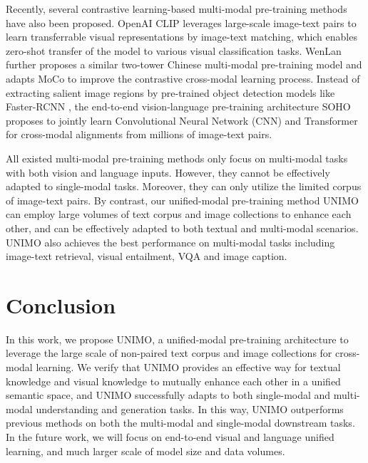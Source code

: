 \documentclass[11pt,a4paper]{article}
\begin{document}
Recently, several contrastive learning-based multi-modal pre-training methods have also been proposed. 
OpenAI CLIP \citep{radford2021learning} leverages large-scale image-text pairs to learn transferrable visual representations by image-text matching, which enables zero-shot transfer of the model to various visual classification tasks. 
WenLan \citep{huo2021wenlan} further proposes a similar two-tower Chinese multi-modal pre-training model and adapts MoCo \citep{he2020momentum} to improve the contrastive cross-modal learning process.
Instead of extracting salient image regions by pre-trained object detection models like Faster-RCNN \citep{ren2016faster}, the end-to-end vision-language pre-training architecture SOHO \citep{huang2021seeing} proposes to jointly learn Convolutional Neural Network (CNN) and Transformer for  cross-modal alignments from millions of image-text pairs. 

All existed multi-modal pre-training methods only focus on multi-modal tasks with both vision and language inputs.
However, they cannot be effectively adapted to single-modal tasks.
Moreover, they can only utilize the limited corpus of image-text pairs.
By contrast, our unified-modal pre-training method UNIMO can employ large volumes of text corpus and image collections to enhance each other, and can be effectively adapted to both textual and multi-modal scenarios.
UNIMO also achieves the best performance on multi-modal tasks including image-text retrieval, visual entailment, VQA and image caption.





\section{Conclusion}



In this work, we propose UNIMO, a unified-modal pre-training architecture to leverage the large scale of non-paired text corpus and image collections for cross-modal learning.
We verify that UNIMO provides an effective way for textual knowledge and visual knowledge to mutually enhance each other in a unified semantic space, and UNIMO successfully adapts to both single-modal and multi-modal understanding and generation tasks. 
In this way, UNIMO outperforms previous methods on both the multi-modal and single-modal downstream tasks.
In the future work, we will focus on end-to-end visual and language unified learning, and much larger scale of model size and data volumes.
\end{document}
